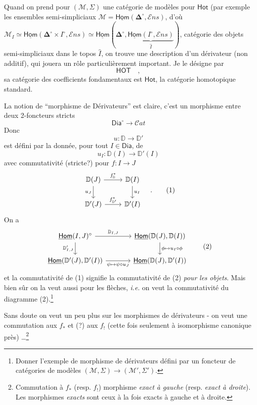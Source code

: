 \documentclass[11pt]{article}
\newcommand{\msp}[1]{\marginpar{\footnotesize [#1]}}
\newcommand{\uHom}{\underline{\mathsf{Hom}}}
\newcommand{\bDelta}{\boldsymbol{\Delta}}
\newcommand{\Dia}{\mathsf{Dia}}
\newcommand{\DD}{\mathbb{D}}
\newcommand{\Ens}{\mathcal{E}ns}
\begin{document}
Quand on prend pour $(\mathcal{M},\Sigma)$ une catégorie de modèles pour $\mathsf{Hot}$ (par exemple les ensembles semi-simpliciaux $\mathcal{M} = \uHom(\bDelta^\circ,\Ens)$, d’où $\mathcal{M}_I \simeq \uHom(\bDelta^\circ \times I^\circ,\Ens) \simeq \uHom(\bDelta^\circ,\underbrace{\uHom(I^\circ,\Ens)}_{\widehat{I}})$, catégorie des objets semi-simpliciaux dans le topos $\widehat{I}$, on trouve une description d’un dérivateur (non additif), qui jouera un rôle particulièrement important. Je le désigne par %
\[
\mathsf{HOT} \quad ,
\]
sa catégorie des coefficients fondamentaux est $\mathsf{Hot}$, la catégorie homotopique standard.

\noindent\msp{page 14}La notion de “morphisme de Dérivateurs” est claire, c’est un morphisme entre deux 2-foncteurs stricts
\[
\Dia^\circ \longrightarrow \mathcal{C}at
\]
Donc
\[
u : \DD \longrightarrow \DD'
\]
est défini par la donnée, pour tout $I \in \Dia$, de
\[
u_I : \DD(I) \longrightarrow \DD'(I)
\]
avec commutativité (stricte?) pour $f : I \to J$
\[
\begin{tikzcd}
\DD(J) \arrow[r, "f^*_{\DD}"] \arrow[d, "u_J"'] & \DD(I) \arrow[d, "u_I"] \\
\DD'(J) \arrow[r, "f^*_{\DD'}"] & \DD'(I)
\end{tikzcd}
\quad . \tag*{(1)}
\]
On a
\[
\begin{tikzcd}[column sep=large]
\uHom(I,J)^\circ \arrow[r, "\DD_{I,J}"] \arrow[d, "\DD'_{I,J}"'] & \uHom(\DD(J),\DD(I)) \arrow[d, "\phi \mapsto u_I \circ \phi"] \\
\uHom(\DD'(J),\DD'(I)) \arrow[r, "\psi \mapsto \psi \circ u_J"'] & \uHom(\DD(J),\DD'(I))
\end{tikzcd}
\tag*{(2)}
\]
et la commutativité de (1) signifie la commutativité de (2) \textit{pour les objets}. Mais bien sûr on la veut aussi pour les flèches, \textit{i.e.} on veut la commutativité du diagramme (2).\footnote[5]{Donner l’exemple de morphisme de dérivateurs défini par un foncteur de catégories de modèles $(\mathcal{M},\Sigma) \to (\mathcal{M}',\Sigma')$.}

Sans doute on veut un peu plus sur les morphismes de dérivateurs - on veut une commutation aux $f_*$ et (?) aux $f_!$ (cette fois seulement à isomorphisme canonique près) \ldots\footnote[6]{Commutation à $f_*$ (resp. $f_!$) morphisme \textit{exact à gauche} (resp. \textit{exact à droite}). Les morphismes \textit{exacts} sont ceux à la fois exacts à gauche et à droite.}
\end{document}
